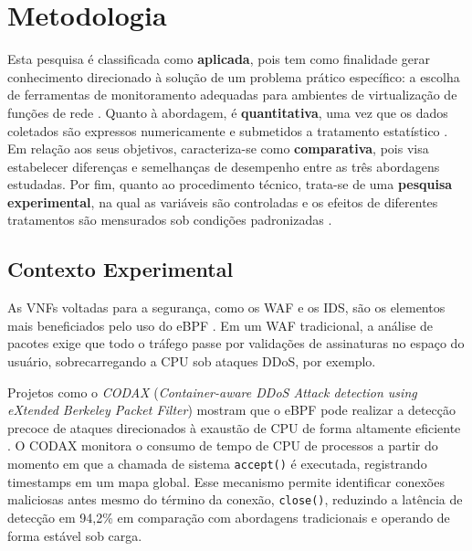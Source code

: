 
\chapter{Metodologia}
\label{chap:metodologia}

Esta pesquisa é classificada como \textbf{aplicada}, pois tem como finalidade gerar conhecimento direcionado à solução de um problema prático específico: a escolha de ferramentas de monitoramento adequadas para ambientes de virtualização de funções de rede \cite{gil2021}. Quanto à abordagem, é \textbf{quantitativa}, uma vez que os dados coletados são expressos numericamente e submetidos a tratamento estatístico \cite{marconi2017}. Em relação aos seus objetivos, caracteriza-se como \textbf{comparativa}, pois visa estabelecer diferenças e semelhanças de desempenho entre as três abordagens estudadas. Por fim, quanto ao procedimento técnico, trata-se de uma \textbf{pesquisa experimental}, na qual as variáveis são controladas e os efeitos de diferentes tratamentos são mensurados sob condições padronizadas \cite{gil2021}.




\section{Contexto Experimental}

As VNFs voltadas para a segurança, como os WAF e os IDS, são os elementos mais beneficiados pelo uso do eBPF \cite{technologies12080122}. Em um WAF tradicional, a análise de pacotes exige que todo o tráfego passe por validações de assinaturas no espaço do usuário, sobrecarregando a CPU sob ataques DDoS, por exemplo.

Projetos como o \textit{CODAX} (\textit{Container-aware DDoS Attack detection using eXtended Berkeley Packet Filter}) mostram que o eBPF pode realizar a detecção precoce de ataques direcionados à exaustão de CPU de forma altamente eficiente \cite{codax2025remya}. O CODAX monitora o consumo de tempo de CPU de processos a partir do momento em que a chamada de sistema \texttt{accept()} é executada, registrando timestamps em um mapa global. Esse mecanismo permite identificar conexões maliciosas antes mesmo do término da conexão, \texttt{close()}, reduzindo a latência de detecção em 94,2\% em comparação com abordagens tradicionais e operando de forma estável sob carga.

